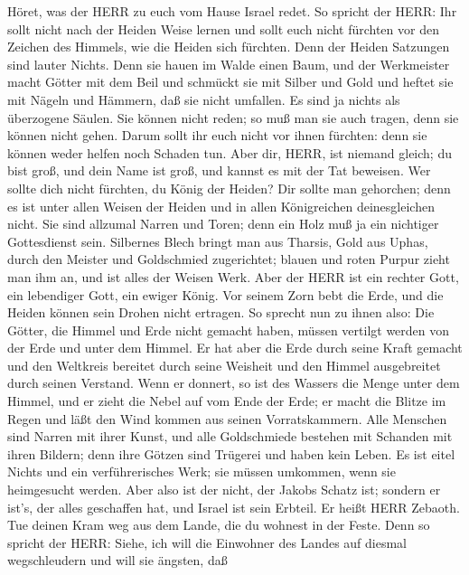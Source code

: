  Höret, was der HERR zu euch vom Hause Israel redet.
 So spricht der HERR: Ihr sollt nicht nach der Heiden Weise
lernen und sollt euch nicht fürchten vor den Zeichen des Himmels, wie
die Heiden sich fürchten.  Denn der Heiden Satzungen sind
lauter Nichts. Denn sie hauen im Walde einen Baum, und der Werkmeister
macht Götter mit dem Beil  und schmückt sie mit Silber und
Gold und heftet sie mit Nägeln und Hämmern, daß sie nicht umfallen.
 Es sind ja nichts als überzogene Säulen. Sie können nicht
reden; so muß man sie auch tragen, denn sie können nicht gehen. Darum
sollt ihr euch nicht vor ihnen fürchten: denn sie können weder helfen
noch Schaden tun.  Aber dir, HERR, ist niemand gleich; du
bist groß, und dein Name ist groß, und kannst es mit der Tat beweisen.
 Wer sollte dich nicht fürchten, du König der Heiden? Dir
sollte man gehorchen; denn es ist unter allen Weisen der Heiden und in
allen Königreichen deinesgleichen nicht.  Sie sind allzumal
Narren und Toren; denn ein Holz muß ja ein nichtiger Gottesdienst sein.
 Silbernes Blech bringt man aus Tharsis, Gold aus Uphas,
durch den Meister und Goldschmied zugerichtet; blauen und roten Purpur
zieht man ihm an, und ist alles der Weisen Werk.  Aber der
HERR ist ein rechter Gott, ein lebendiger Gott, ein ewiger König. Vor
seinem Zorn bebt die Erde, und die Heiden können sein Drohen nicht
ertragen.  So sprecht nun zu ihnen also: Die Götter, die
Himmel und Erde nicht gemacht haben, müssen vertilgt werden von der Erde
und unter dem Himmel.  Er hat aber die Erde durch seine
Kraft gemacht und den Weltkreis bereitet durch seine Weisheit und den
Himmel ausgebreitet durch seinen Verstand.  Wenn er
donnert, so ist des Wassers die Menge unter dem Himmel, und er zieht die
Nebel auf vom Ende der Erde; er macht die Blitze im Regen und läßt den
Wind kommen aus seinen Vorratskammern.  Alle Menschen sind
Narren mit ihrer Kunst, und alle Goldschmiede bestehen mit Schanden mit
ihren Bildern; denn ihre Götzen sind Trügerei und haben kein Leben.
 Es ist eitel Nichts und ein verführerisches Werk; sie
müssen umkommen, wenn sie heimgesucht werden.  Aber also
ist der nicht, der Jakobs Schatz ist; sondern er ist's, der alles
geschaffen hat, und Israel ist sein Erbteil. Er heißt HERR Zebaoth.
 Tue deinen Kram weg aus dem Lande, die du wohnest in der
Feste.  Denn so spricht der HERR: Siehe, ich will die
Einwohner des Landes auf diesmal wegschleudern und will sie ängsten, daß
